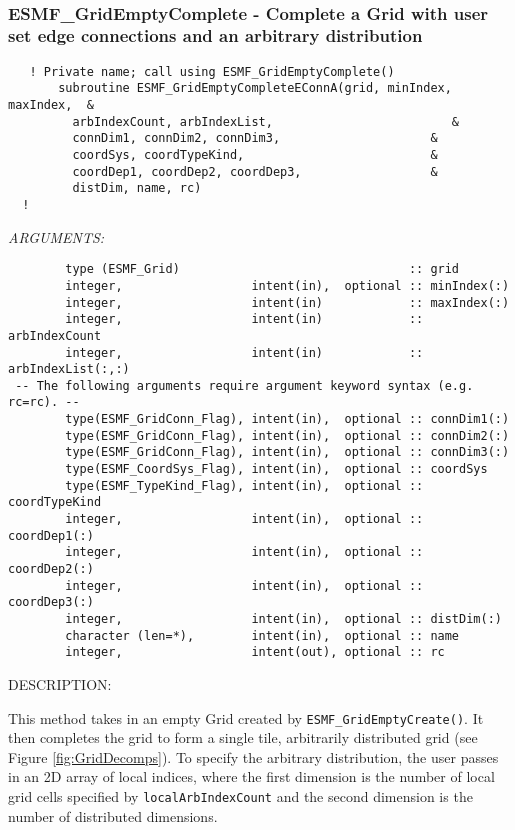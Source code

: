 \mbox{}\hrulefill\ 
 
\subsubsection [ESMF\_GridEmptyComplete] {ESMF\_GridEmptyComplete - Complete a Grid with user set edge connections and an arbitrary distribution}


 
\begin{verbatim}   ! Private name; call using ESMF_GridEmptyComplete()
       subroutine ESMF_GridEmptyCompleteEConnA(grid, minIndex, maxIndex,  &
         arbIndexCount, arbIndexList,                         &
         connDim1, connDim2, connDim3,                     &
         coordSys, coordTypeKind,                          &
         coordDep1, coordDep2, coordDep3,                  &
         distDim, name, rc)
  !\end{verbatim}{\em ARGUMENTS:}
\begin{verbatim}        type (ESMF_Grid)                                :: grid
        integer,                  intent(in),  optional :: minIndex(:)
        integer,                  intent(in)            :: maxIndex(:)
        integer,                  intent(in)            :: arbIndexCount
        integer,                  intent(in)            :: arbIndexList(:,:)
 -- The following arguments require argument keyword syntax (e.g. rc=rc). --
        type(ESMF_GridConn_Flag), intent(in),  optional :: connDim1(:)
        type(ESMF_GridConn_Flag), intent(in),  optional :: connDim2(:)
        type(ESMF_GridConn_Flag), intent(in),  optional :: connDim3(:)
        type(ESMF_CoordSys_Flag), intent(in),  optional :: coordSys
        type(ESMF_TypeKind_Flag), intent(in),  optional :: coordTypeKind
        integer,                  intent(in),  optional :: coordDep1(:)
        integer,                  intent(in),  optional :: coordDep2(:)
        integer,                  intent(in),  optional :: coordDep3(:)
        integer,                  intent(in),  optional :: distDim(:)
        character (len=*),        intent(in),  optional :: name
        integer,                  intent(out), optional :: rc\end{verbatim}
{\sf DESCRIPTION:\\ }


  
   This method takes in an empty Grid created by {\tt ESMF\_GridEmptyCreate()}.
   It then completes the grid to form a single tile, arbitrarily distributed grid
   (see Figure \ref{fig:GridDecomps}).
   To specify the arbitrary distribution, the user passes in an 2D array
   of local indices, where the first dimension is the number of local grid cells
   specified by {\tt localArbIndexCount} and the second dimension is the number of distributed
   dimensions.
  
